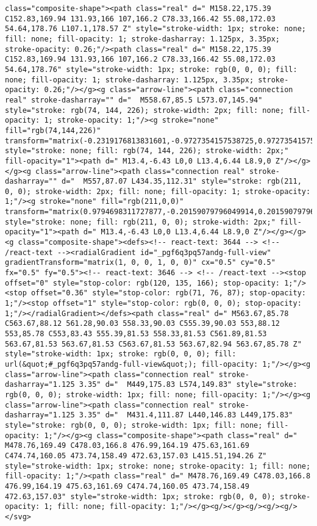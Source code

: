 \documentclass[
]{article}
\begin{document}
\begin{verbatim}
class="composite-shape"><path class="real" d=" M158.22,175.39 C152.83,169.94 131.93,166 107,166.2 C78.33,166.42 55.08,172.03 54.64,178.76 L107.1,178.57 Z" style="stroke-width: 1px; stroke: none; fill: none; fill-opacity: 1; stroke-dasharray: 1.125px, 3.35px; stroke-opacity: 0.26;"/><path class="real" d=" M158.22,175.39 C152.83,169.94 131.93,166 107,166.2 C78.33,166.42 55.08,172.03 54.64,178.76" style="stroke-width: 1px; stroke: rgb(0, 0, 0); fill: none; fill-opacity: 1; stroke-dasharray: 1.125px, 3.35px; stroke-opacity: 0.26;"/></g><g class="arrow-line"><path class="connection real" stroke-dasharray="" d="  M558.67,85.5 L573.07,145.94" style="stroke: rgb(74, 144, 226); stroke-width: 2px; fill: none; fill-opacity: 1; stroke-opacity: 1;"/><g stroke="none" fill="rgb(74,144,226)" transform="matrix(-0.2319176813831601,-0.9727354157538725,0.9727354157538725,-0.2319176813831601,574,149.8333282470703)" style="stroke: none; fill: rgb(74, 144, 226); stroke-width: 2px;" fill-opacity="1"><path d=" M13.4,-6.43 L0,0 L13.4,6.44 L8.9,0 Z"/></g></g><g class="arrow-line"><path class="connection real" stroke-dasharray="" d="  M557,87.07 L434.35,112.31" style="stroke: rgb(211, 0, 0); stroke-width: 2px; fill: none; fill-opacity: 1; stroke-opacity: 1;"/><g stroke="none" fill="rgb(211,0,0)" transform="matrix(0.9794698311727877,-0.20159079796049914,0.20159079796049914,0.9794698311727877,430.4315199830119,113.11883182991609)" style="stroke: none; fill: rgb(211, 0, 0); stroke-width: 2px;" fill-opacity="1"><path d=" M13.4,-6.43 L0,0 L13.4,6.44 L8.9,0 Z"/></g></g><g class="composite-shape"><defs><!-- react-text: 3644 --> <!-- /react-text --><radialGradient id="_pgf6q3pq57andg-full-view" gradientTransform="matrix(1, 0, 0, 1, 0, 0)" cx="0.5" cy="0.5" fx="0.5" fy="0.5"><!-- react-text: 3646 --> <!-- /react-text --><stop offset="0" style="stop-color: rgb(120, 135, 166); stop-opacity: 1;"/><stop offset="0.36" style="stop-color: rgb(71, 76, 87); stop-opacity: 1;"/><stop offset="1" style="stop-color: rgb(0, 0, 0); stop-opacity: 1;"/></radialGradient></defs><path class="real" d=" M563.67,85.78 C563.67,88.12 561.28,90.03 558.33,90.03 C555.39,90.03 553,88.12 553,85.78 C553,83.43 555.39,81.53 558.33,81.53 C561.89,81.53 563.67,81.53 563.67,81.53 C563.67,81.53 563.67,82.94 563.67,85.78 Z" style="stroke-width: 1px; stroke: rgb(0, 0, 0); fill: url(&quot;#_pgf6q3pq57andg-full-view&quot;); fill-opacity: 1;"/></g><g class="arrow-line"><path class="connection real" stroke-dasharray="1.125 3.35" d="  M449,175.83 L574,149.83" style="stroke: rgb(0, 0, 0); stroke-width: 1px; fill: none; fill-opacity: 1;"/></g><g class="arrow-line"><path class="connection real" stroke-dasharray="1.125 3.35" d="  M431.4,111.87 L440,146.83 L449,175.83" style="stroke: rgb(0, 0, 0); stroke-width: 1px; fill: none; fill-opacity: 1;"/></g><g class="composite-shape"><path class="real" d=" M478.76,169.49 C478.03,166.8 476.99,164.19 475.63,161.69 C474.74,160.05 473.74,158.49 472.63,157.03 L415.51,194.26 Z" style="stroke-width: 1px; stroke: none; stroke-opacity: 1; fill: none; fill-opacity: 1;"/><path class="real" d=" M478.76,169.49 C478.03,166.8 476.99,164.19 475.63,161.69 C474.74,160.05 473.74,158.49 472.63,157.03" style="stroke-width: 1px; stroke: rgb(0, 0, 0); stroke-opacity: 1; fill: none; fill-opacity: 1;"/></g><g/></g><g/><g/><g/></svg>

\end{verbatim}
\end{document}
